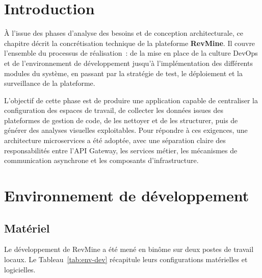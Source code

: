 
\section{Introduction}

À l'issue des phases d'analyse des besoins et de conception architecturale, ce chapitre décrit
la concrétisation technique de la plateforme \textbf{RevMine}. Il couvre l'ensemble du processus
de réalisation~: de la mise en place de la culture DevOps et de l'environnement de développement
jusqu'à l'implémentation des différents modules du système, en passant par la stratégie de test,
le déploiement et la surveillance de la plateforme.

L'objectif de cette phase est de produire une application capable de centraliser la configuration
des espaces de travail, de collecter les données issues des plateformes de gestion de code, de les
nettoyer et de les structurer, puis de générer des analyses visuelles exploitables. Pour répondre
à ces exigences, une architecture microservices a été adoptée, avec une séparation claire des
responsabilités entre l'API Gateway, les services métier, les mécanismes de communication
asynchrone et les composants d'infrastructure.

\section{Environnement de développement}

\subsection{Matériel}

Le développement de RevMine a été mené en binôme sur deux postes de travail locaux. Le
Tableau~\ref{tab:env-dev} récapitule leurs configurations matérielles et logicielles.

